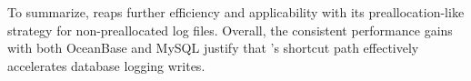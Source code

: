 To summarize,
\odes reaps further efficiency and applicability with its preallocation-like strategy for non-preallocated log files.
Overall, the consistent performance gains with both OceanBase and MySQL 
justify that \odes's shortcut path effectively accelerates database logging writes.

